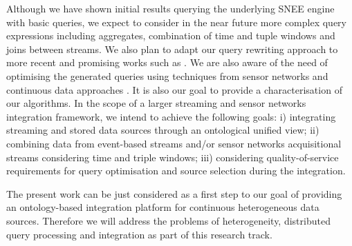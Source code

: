 
Although we have shown initial results querying the underlying SNEE engine with basic queries, we expect to consider in
the near future more complex query expressions including aggregates, combination of time and tuple windows and joins
between streams. We also plan to adapt our query rewriting approach to more recent and promising works such as
\cite{PerezUrbina_09}. We are also aware of the need of optimising the generated queries using techniques from sensor
networks and continuous data approaches \cite{Abadi_2005,Arasu_06a,Galpin_09}. It is also our goal to provide a
characterisation of our algorithms. In the scope of a larger streaming and sensor networks integration framework, we
intend to achieve the following goals: i) integrating streaming and stored data sources through an ontological unified
view; ii) combining data from event-based streams and/or sensor networks acquisitional streams considering time and
triple windows; iii) considering quality-of-service requirements for query optimisation and source selection during the
integration.

The present work can be just considered as a first step to our goal of providing an ontology-based integration platform
for continuous heterogeneous data sources. Therefore we will address the problems of heterogeneity, distributed query
processing and integration as part of this research track.
